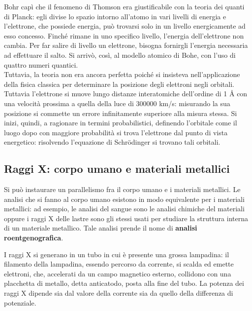 Bohr capì che il fenomeno di Thomson era giustificabile con la teoria dei quanti di Planck: egli divise lo spazio intorno all’atomo in vari livelli di energia e l’elettrone, che possiede energia, può trovarsi solo in un livello energicamente ad esso concesso. Finché rimane in uno specifico livello, l’energia dell’elettrone non cambia. Per far salire di livello un elettrone, bisogna fornirgli l’energia necessaria ad effettuare il salto. Si arrivò, così, al modello atomico di Bohe, con l’uso di quattro numeri quantici.\\
Tuttavia, la teoria non era ancora perfetta poiché si insisteva nell’applicazione della fisica classica per determinare la posizione degli elettroni negli orbitali. Tuttavia l’elettrone si muove lungo distanze interatomiche dell’ordine di 1 Å con una velocità prossima a quella della luce di 300000 km/s: misurando la sua posizione si commette un errore infinitamente superiore alla misura stessa. Si inizi, quindi, a ragionare in termini probabilistici, definendo l’orbitale come il luogo dopo con maggiore probabilità si trova l’elettrone dal punto di vista energetico: risolvendo l’equazione di Schrödinger si trovano tali orbitali.

\subsection{Raggi X: corpo umano e materiali metallici}

Si può instaurare un parallelismo fra il corpo umano e i materiali metallici. Le analisi che si fanno al corpo umano esistono in modo equivalente per i materiali metallici: ad esempio, le analisi del sangue sono le analisi chimiche del materiali oppure i raggi X delle lastre sono gli stessi usati per studiare la struttura interna di un materiale metallico. Tale analisi prende il nome di \textbf{analisi roentgenografica}.

I raggi X si generano in un tubo in cui è presente una grossa lampadina: il filamento della lampadina, essendo percorso da corrente, si scalda ed emette elettroni, che, accelerati da un campo magnetico esterno, collidono con una placchetta di metallo, detta anticatodo, posta alla fine del tubo.
La potenza dei raggi X dipende sia dal valore della corrente sia da quello della differenza di potenziale.

